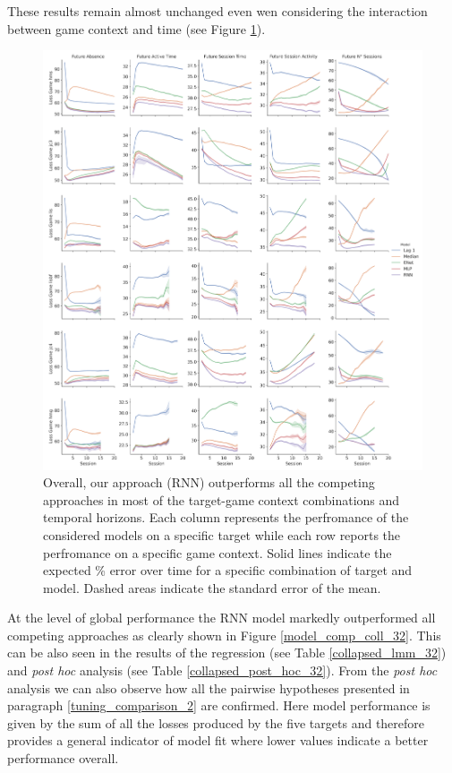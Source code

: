These results remain almost unchanged even wen considering the interaction between game context and time (see Figure \ref{model_comp_non_coll_32}).
\begin{figure}[H]
\centering
\includegraphics[height=0.5\textheight,keepaspectratio]{images/chapter_3/models_comparison_non_collapsed_32.png}
\caption[\textbf{Model comparison without collapsing}]{ Overall, our approach (RNN) outperforms all the competing approaches in most of the target-game context combinations and temporal horizons. Each column represents the perfromance of the considered models on a specific target while each row reports the perfromance on a specific game context. Solid lines indicate the expected \% error over time for a specific combination of target and model. Dashed areas indicate the standard error of the mean.}
\label{model_comp_non_coll_32} 
\end{figure}
At the level of global performance the RNN model markedly outperformed all competing approaches as clearly shown in Figure \ref{model_comp_coll_32}. This can be also seen in the results of the regression (see Table \ref{collapsed_lmm_32}) and  \textit{post hoc} analysis (see Table \ref{collapsed_post_hoc_32}). From the \textit{post hoc} analysis we can also observe how all the pairwise hypotheses presented in paragraph \ref{tuning_comparison_2} are confirmed. Here model performance is given by the sum of all the losses produced by the five targets and therefore provides a general indicator of model fit where lower values indicate a better performance overall.
